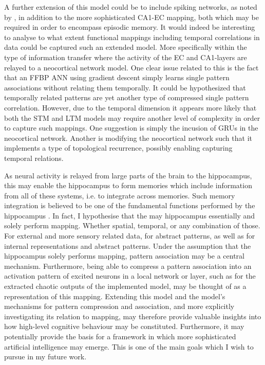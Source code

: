 A further extension of this model could be to include spiking networks, as noted by \cite{Hattori2014}, in addition to the more sophisticated CA1-EC mapping, both which may be required in order to encompass episodic memory. 
It would indeed be interesting to analyse to what extent functional mappings including temporal correlations in data could be captured such an extended model. More specifically within the type of information transfer where the activity of the EC and CA1-layers are relayed to a neocortical network model.
One clear issue related to this is the fact that an FFBP ANN using gradient descent simply learns single pattern associations without relating them temporally.
It could be hypothesized that temporally related patterns are yet another type of compressed single pattern correlation. However, due to the temporal dimension it appears more likely that both the STM and LTM models may require another level of complexity in order to capture such mappings. One suggestion is simply the incusion of GRUs in the neocortical network. Another is modifying the neocortical network such that it implements a type of topological recurrence, possibly enabling capturing temporal relations.


As neural activity is relayed from large parts of the brain to the hippocampus, this may enable the hippocampus to form memories which include information from all of these systems, i.e. to integrate across memories. Such memory integration is believed to be one of the fundamental functions performed by the hippocampus \citep{Rolls1998chpt1}.
In fact, I hypothesise that the may hippocampus essentially and solely perform mapping. Whether spatial, temporal, or any combination of those. For external and more sensory related data, for abstract patterns, as well as for internal representations and abstract patterns.
Under the assumption that the hippocampus solely performs mapping, pattern association may be a central mechanism. Furthermore, being able to compress a pattern association into an activation pattern of excited neurons in a local network or layer, such as for the extracted chaotic outputs of the implemented model, may be thought of as a representation of this mapping.
Extending this model and the model's mechanisms for pattern compression and association, and more explicitly investigating its relation to mapping, may therefore provide valuable insights into how high-level cognitive behaviour may be constituted. Furthermore, it may potentially provide the basis for a framework in which more sophisticated artificial intelligence may emerge. This is one of the main goals which I wish to pursue in my future work.

